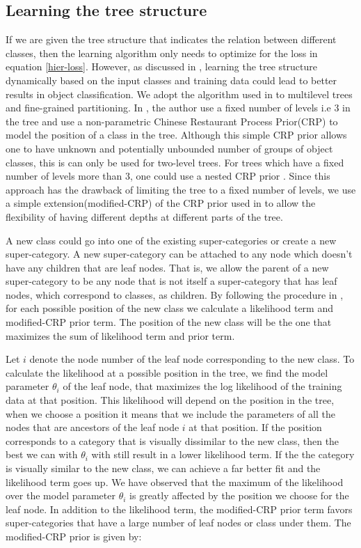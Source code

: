 \documentclass[10pt,twocolumn,letterpaper]{article}
\begin{document}
\subsection{Learning the tree structure}
If we are given the tree structure that indicates the relation between different classes, then the 
learning algorithm only needs to optimize for the loss in equation \ref{hier-loss}. However, as 
discussed in \cite{ruslan}, learning the tree structure dynamically based on the input classes and training data
could lead to better results in object classification. We adopt the algorithm used in \cite{ruslan} to multilevel trees
and fine-grained partitioning. In \cite{ruslan}, the author use a fixed number of levels i.e 3 in the tree and use
a non-parametric Chinese Restaurant Process Prior(CRP) to model the position of a class in the tree. Although this simple
CRP prior allows one to have unknown and potentially unbounded number of groups of object classes, this is can only be
used for two-level trees. For trees which have a fixed number of levels more than 3, one could use a nested CRP prior \cite{nestedCRP}.
Since this approach has the drawback of limiting the tree to a fixed number of levels, we use a simple extension(modified-CRP) of the
CRP prior used in \cite{ruslan} to allow the flexibility of  having different depths at different parts of the tree.    

A new class could go into one of the existing super-categories or create a new super-category. A new super-category 
can be attached to any node which doesn't have any children that are leaf nodes. That is, we allow the parent of a new
super-category to be any node that is not itself a super-category that has leaf nodes, which correspond to classes, as children.
By following the procedure in \cite{ruslan},  for each possible position of the new class we calculate a likelihood term and 
modified-CRP prior term. The position of the new class will be the one that maximizes the sum of likelihood term and  prior term. 

Let $i$ denote the node number of the leaf node corresponding to the new class.   
To calculate the likelihood at a possible position in the tree, we find the model parameter $\theta_{i}$ of the leaf node, 
that maximizes the log likelihood of the training data at that position. This likelihood will depend on the position in the tree, when 
we choose a position it means that we include the parameters of all the nodes that are ancestors of the leaf node $i$ at that position. 
If the position corresponds to a category that is visually dissimilar to the new class, then the best we can with $\theta_{i}$ with still 
result in a lower likelihood term. If the the category is visually similar to the new class, we can achieve a far better fit and the likelihood
term goes up. We have observed that the maximum of the likelihood over the model parameter $\theta_{i}$ is greatly affected by the position
we choose for the leaf node. In addition to the likelihood term, the modified-CRP prior term favors super-categories that have a large number of 
leaf nodes or class under them. The modified-CRP prior is given by:
\end{document}
